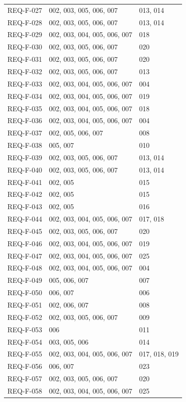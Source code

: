\documentclass[11pt,a4paper]{article}
\begin{document}
{\begin{longtable}{@{}P{2.5cm}P{6.1cm}P{6.2cm}@{}}
REQ-F-027 & 002, 003, 005, 006, 007 & 013, 014\\
REQ-F-028 & 002, 003, 005, 006, 007 & 013, 014\\
REQ-F-029 & 002, 003, 004, 005, 006, 007 & 018\\
REQ-F-030 & 002, 003, 005, 006, 007 & 020\\
REQ-F-031 & 002, 003, 005, 006, 007 & 020\\
REQ-F-032 & 002, 003, 005, 006, 007 & 013\\
REQ-F-033 & 002, 003, 004, 005, 006, 007 & 004\\
REQ-F-034 & 002, 003, 004, 005, 006, 007 & 019\\
REQ-F-035 & 002, 003, 004, 005, 006, 007 & 018\\
REQ-F-036 & 002, 003, 004, 005, 006, 007 & 004\\
REQ-F-037 & 002, 005, 006, 007 & 008\\
REQ-F-038 & 005, 007 & 010\\
REQ-F-039 & 002, 003, 005, 006, 007 & 013, 014\\
REQ-F-040 & 002, 003, 005, 006, 007 & 013, 014\\
REQ-F-041 & 002, 005 & 015\\
REQ-F-042 & 002, 005 & 015\\
REQ-F-043 & 002, 005 & 016\\
REQ-F-044 & 002, 003, 004, 005, 006, 007 & 017, 018\\
REQ-F-045 & 002, 003, 005, 006, 007 & 020\\
REQ-F-046 & 002, 003, 004, 005, 006, 007 & 019\\
REQ-F-047 & 002, 003, 004, 005, 006, 007 & 025\\
REQ-F-048 & 002, 003, 004, 005, 006, 007 & 004\\
REQ-F-049 & 005, 006, 007 & 007\\
REQ-F-050 & 006, 007 & 006\\
REQ-F-051 & 002, 006, 007 & 008\\
REQ-F-052 & 002, 003, 005, 006, 007 & 009\\
REQ-F-053 & 006 & 011\\
REQ-F-054 & 003, 005, 006 & 014\\
REQ-F-055 & 002, 003, 004, 005, 006, 007 & 017, 018, 019\\
REQ-F-056 & 006, 007 & 023\\
REQ-F-057 & 002, 003, 005, 006, 007 & 020\\
REQ-F-058 & 002, 003, 004, 005, 006, 007 & 025\\

\end{longtable}}
\end{document}
